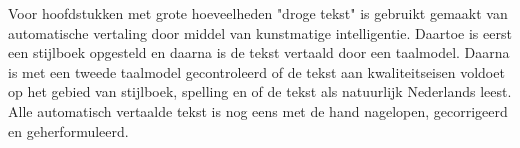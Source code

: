 Voor hoofdstukken met grote hoeveelheden "droge tekst" is gebruikt gemaakt van automatische vertaling door middel van
kunstmatige intelligentie. Daartoe is eerst een stijlboek opgesteld en daarna is de tekst vertaald door een taalmodel. Daarna
is met een tweede taalmodel gecontroleerd of de tekst aan kwaliteitseisen voldoet op het gebied van stijlboek, spelling en of
de tekst als natuurlijk Nederlands leest. Alle automatisch vertaalde tekst is nog eens met de hand nagelopen, gecorrigeerd
en geherformuleerd.
